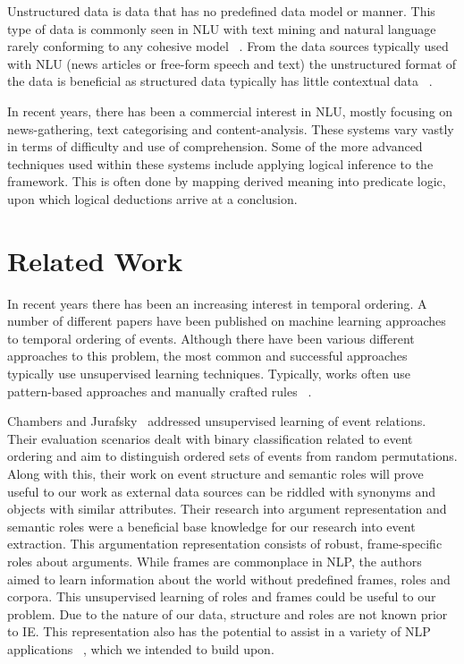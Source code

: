\documentclass[bsc,frontabs,twoside,singlespacing,parskip,deptreport]{infthesis}     %
\begin{document}
Unstructured data is data that has no predefined data model or manner. This type of data is
commonly seen in NLU with text mining and natural language rarely conforming to any cohesive model ~\cite{feldman2007text}.
From the data sources typically used with NLU (news articles or free-form speech and text) the unstructured format of
the data is beneficial as structured data typically has little contextual data ~\cite{feldman2007text}.

In recent years, there has been a commercial interest in NLU, mostly focusing on news-gathering, text categorising and
content-analysis. These systems vary vastly in terms of difficulty and use of comprehension. Some of the more
advanced techniques used within these systems include applying logical inference to the framework. This is often done
by mapping derived meaning into predicate logic, upon which logical deductions arrive at a conclusion.


\section{Related Work}
In recent years there has been an increasing interest in temporal ordering.
A number of different papers have been published on machine learning approaches to temporal ordering of events.
Although there have been various different approaches to this problem, the most common and successful approaches typically
use unsupervised learning techniques. Typically, works often use pattern-based approaches and manually crafted rules ~\cite{chklovski2004mining}.  

Chambers and Jurafsky~\cite{chambers2009unsupervised} addressed unsupervised learning of event relations. Their evaluation
scenarios dealt with binary classification related to event ordering and aim to distinguish ordered sets
of events from random permutations. Along with this, their work on event structure and semantic roles will prove useful
to our work as external data sources can be riddled with synonyms and objects with similar attributes.
Their research into argument representation and semantic roles were a beneficial base
knowledge for our research into event extraction.
This argumentation representation consists of robust,
frame-specific roles about arguments. While frames are commonplace in NLP, the authors aimed to learn information
about the world without predefined frames, roles and corpora. This unsupervised learning of roles and frames could
be useful to our problem. Due to the nature of our data, structure and roles are not known prior to
IE. This representation also has the potential to assist in a variety of NLP applications ~\cite{chambers2009unsupervised}, which
we intended to build upon.
\end{document}
